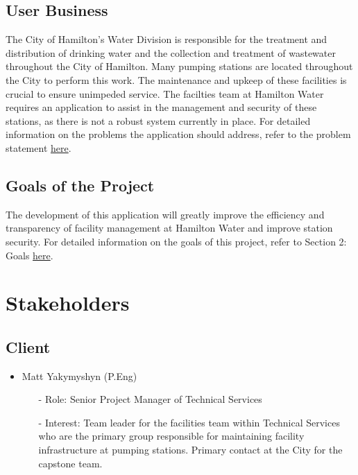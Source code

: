 \documentclass[12pt]{article}
\begin{document}
\subsection{User Business}
The City of Hamilton's Water Division is responsible for the
treatment and distribution of drinking water and the collection and
treatment of wastewater throughout the City of Hamilton. Many pumping
stations are located throughout the City to perform this work. The
maintenance and upkeep of these facilities is crucial to ensure
unimpeded service. The facilties team at Hamilton Water requires an
application to assist in the management and security of these
stations, as there is not a robust system currently in place. For
detailed information on the problems the application should address,
refer to the problem statement
\href{https://github.com/Spitgranger/capstone/blob/main/docs/ProblemStatementAndGoals/ProblemStatement.pdf}{here}.
\subsection{Goals of the Project}
The development of this application will greatly improve the
efficiency and transparency of facility management at Hamilton Water
and improve station security. For detailed information on the goals
of this project, refer to Section 2: Goals
\href{https://github.com/Spitgranger/capstone/blob/main/docs/ProblemStatementAndGoals/ProblemStatement.pdf}{here}.
\section{Stakeholders}
\subsection{Client}

\begin{itemize}
  \item Matt Yakymyshyn (P.Eng)
    \begin{itemize}
      \item[-] Role: Senior Project Manager of Technical Services
      \item[-] Interest: Team leader for the facilities team within
        Technical Services who are the primary group responsible for
        maintaining facility infrastructure at pumping stations.
        Primary contact at the City for the capstone team.
    \end{itemize}
\end{itemize}
\end{document}
